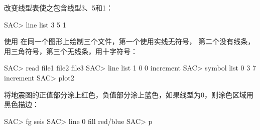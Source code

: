 改变线型表使之包含线型3、5和1：
\begin{SACCode}
SAC> line list 3 5 1
\end{SACCode}

使用  在同一个图形上绘制三个文件，第一个使用实线无符号，
第二个没有线条，用三角符号，第三个无线条，用十字符号：
\begin{SACCode}
SAC> read file1 file2 file3
SAC> line list 1 0 0 increment
SAC> symbol list 0 3 7 increment
SAC> plot2
\end{SACCode}

将地震图的正值部分涂上红色，负值部分涂上蓝色，如果线型为0，则涂色区域用
黑色描边：
\begin{SACCode}
SAC> fg seis
SAC> line 0 fill red/blue
SAC> p
\end{SACCode}
